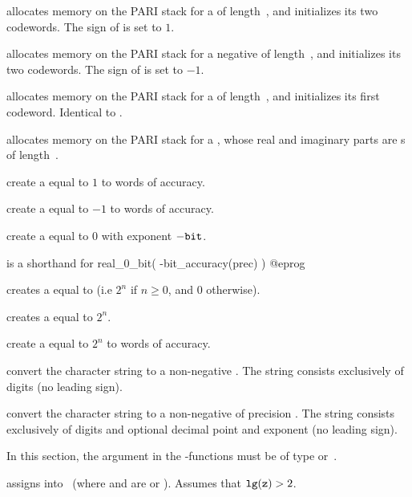  allocates memory on the PARI stack for a
 of length~, and initializes its two codewords. The sign
of  is set to $1$.

 allocates memory on the PARI stack for a negative
 of length~, and initializes its two codewords. The sign
of  is set to $-1$.

 allocates memory on the PARI stack for a 
of length~, and initializes its first codeword. Identical to
.

 allocates memory on the PARI stack for a
, whose real and imaginary parts are s
of length~.

 create a  equal to $1$ to 
words of accuracy.

 create a  equal to $-1$ to 
words of accuracy.

 create a  equal to $0$ with
exponent $-{\tt bit}$.

 is a shorthand for
\bprog
  real_0_bit( -bit_accuracy(prec) )
@eprog

 creates a  equal to  (i.e
$2^n$ if $n \geq 0$, and $0$ otherwise).

 creates a  equal to $2^n$.

 create a  equal to $2^n$
to  words of accuracy.

 convert the character string  to a
non-negative . The string  consists exclusively of digits (no
leading sign).

 convert the character string 
to a non-negative  of precision .
The string  consists exclusively of digits and optional decimal
point and exponent (no leading sign).

In this section, the  argument in the -functions must be of type
 or~.

 assigns  into~ (where 
and  are  or ).
Assumes that ${\tt lg(z)} > 2$.

